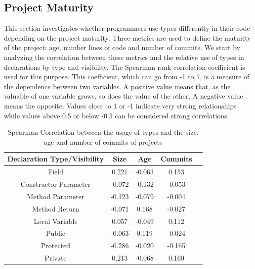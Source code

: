 \documentclass[preprint]{sigplanconf}
\begin{document}
\subsection{Project Maturity\label{res-size}}


This section investigates whether programmers use types differently in their code depending on the project maturity.
Three metrics are used to define the maturity of the project: age, number lines of code and number of commits.
We start by analyzing the correlation between these metrics and the relative use of types in declarations by type and visibility.
The Spearman rank correlation coefficient is used for this purpose.
This coefficient, which can go from -1 to 1, is a measure of the dependence between two variables.
A positive value means that, as the valuable of one variable grows, so does the value of the other.
A negative value means the opposite.
Values close to 1 or -1 indicate very strong relationships while values above 0.5 or below -0.5 can be considered strong correlations.

\begin{table}[h!]
\centering{}%
\begin{tabular}{|c|c|c|c|c|}
\hline 
Declaration Type/Visibility	& Size		& Age	&	Commits\\
\hline 
\hline 
Field						&  0.221	& -0.063	&  0.153	\\ \hline
Constructor Parameter		& -0.072	& -0.132	& -0.053	\\ \hline
Method Parameter			& -0.123	& -0.079	& -0.004	\\ \hline
Method Return				& -0.071	&  0.168	& -0.027	\\ \hline
Local Variable		 		&  0.057	& -0.049	&  0.112	\\ 
\hline 			 
\hline 		 
Public						& -0.063	&   0.119	& -0.024	\\ \hline
Protected					& -0.286	&  -0.020	& -0.165	\\ \hline
Private				 		&  0.213	&  -0.068	&  0.160	\\ \hline
\end{tabular}
\label{tab:all_correlation_maturity}
\caption{Spearman Correlation between the usage of types and the size, age and number of commits of projects}
\end{table}	
\end{document}
